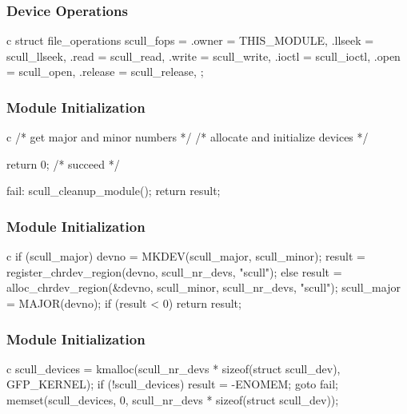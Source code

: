 \documentclass[dvipsnames]{beamer}
\begin{document}
\begin{frame}[fragile]
  \frametitle{Device Operations}

  \begin{example}
    \begin{pygments}{c}
struct file_operations scull_fops = {
    .owner   = THIS_MODULE,
    .llseek  = scull_llseek,
    .read    = scull_read,
    .write   = scull_write,
    .ioctl   = scull_ioctl,
    .open    = scull_open,
    .release = scull_release,
};
    \end{pygments}
  \end{example}
\end{frame}

\begin{frame}[fragile]
  \frametitle{Module Initialization}

  \begin{example}
    \begin{pygments}{c}
  /* get major and minor numbers */
  /* allocate and initialize devices */

  return 0; /* succeed */

fail:
  scull_cleanup_module();
  return result;
    \end{pygments}
  \end{example}
\end{frame}

\begin{frame}[fragile]
  \frametitle{Module Initialization}

  \begin{example}
    \begin{pygments}{c}
if (scull_major) {
    devno = MKDEV(scull_major, scull_minor);
    result = register_chrdev_region(devno,
                scull_nr_devs, "scull");
} else {
    result = alloc_chrdev_region(&devno,
        scull_minor, scull_nr_devs, "scull");
    scull_major = MAJOR(devno);
}
if (result < 0) {
    return result;
}
    \end{pygments}
  \end{example}
\end{frame}

\begin{frame}[fragile]
  \frametitle{Module Initialization}

  \begin{example}
    \begin{pygments}{c}
scull_devices = kmalloc(scull_nr_devs *
       sizeof(struct scull_dev), GFP_KERNEL);
if (!scull_devices) {
    result = -ENOMEM;
    goto fail;
}
memset(scull_devices, 0, scull_nr_devs *
          sizeof(struct scull_dev));
    \end{pygments}
  \end{example}
\end{frame}
\end{document}
